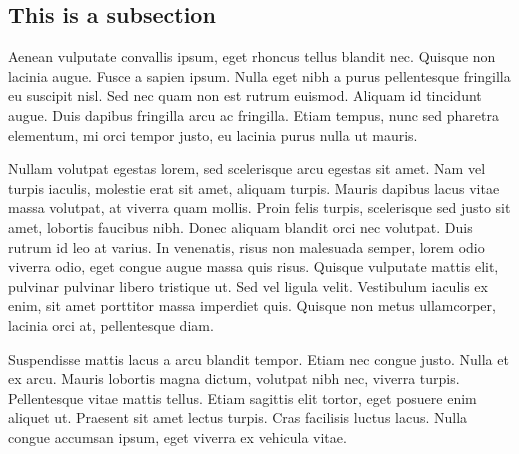 \subsection{This is a subsection}

Aenean vulputate convallis ipsum, eget rhoncus tellus blandit nec. Quisque non lacinia augue. Fusce a sapien ipsum. Nulla eget nibh a purus pellentesque fringilla eu suscipit nisl. Sed nec quam non est rutrum euismod. Aliquam id tincidunt augue. Duis dapibus fringilla arcu ac fringilla. Etiam tempus, nunc sed pharetra elementum, mi orci tempor justo, eu lacinia purus nulla ut mauris.

Nullam volutpat egestas lorem, sed scelerisque arcu egestas sit amet. Nam vel turpis iaculis, molestie erat sit amet, aliquam turpis. Mauris dapibus lacus vitae massa volutpat, at viverra quam mollis. Proin felis turpis, scelerisque sed justo sit amet, lobortis faucibus nibh. Donec aliquam blandit orci nec volutpat. Duis rutrum id leo at varius. In venenatis, risus non malesuada semper, lorem odio viverra odio, eget congue augue massa quis risus. Quisque vulputate mattis elit, pulvinar pulvinar libero tristique ut. Sed vel ligula velit. Vestibulum iaculis ex enim, sit amet porttitor massa imperdiet quis. Quisque non metus ullamcorper, lacinia orci at, pellentesque diam.

Suspendisse mattis lacus a arcu blandit tempor. Etiam nec congue justo. Nulla et ex arcu. Mauris lobortis magna dictum, volutpat nibh nec, viverra turpis. Pellentesque vitae mattis tellus. Etiam sagittis elit tortor, eget posuere enim aliquet ut. Praesent sit amet lectus turpis. Cras facilisis luctus lacus. Nulla congue accumsan ipsum, eget viverra ex vehicula vitae. 